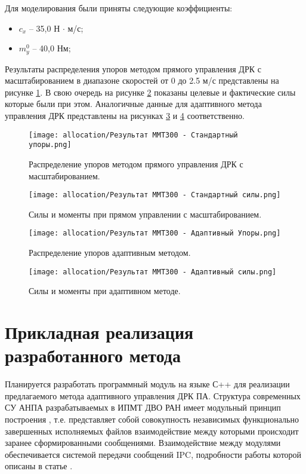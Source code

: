 Для моделирования были приняты следующие коэффициенты:
\begin{itemize}
    \item $c_x$ -- 35,0 Н $\cdot$ м/с;
    \item $m_y^0$ -- 40,0 Нм;
\end{itemize}

Результаты распределения упоров методом прямого управления ДРК с масштабированием в диапазоне скоростей от 0 до 2.5 м/с представлены на рисунке \ref{fig:mmt-300-allocation-fix-thrust}.
В свою очередь на рисунке \ref{fig:mmt-300-allocation-fix-force} показаны целевые и фактические силы которые были при этом.
Аналогичные данные для адаптивного метода управления ДРК представлены на рисунках \ref{fig:mmt-300-allocation-optimal-thrust} и \ref{fig:mmt-300-allocation-optimal-force} соответственно.

\begin{figure}[ht]
    \centering
    \texttt{[image: allocation/Результат ММТ300 - Стандартный упоры.png]}
    \caption{Распределение упоров методом прямого управления ДРК с масштабированием.}
    \label{fig:mmt-300-allocation-fix-thrust}
\end{figure}

\begin{figure}[ht]
    \centering
    \texttt{[image: allocation/Результат ММТ300 - Стандартный силы.png]}
    \caption{Силы и моменты при прямом управлении с масштабированием.}
    \label{fig:mmt-300-allocation-fix-force}
\end{figure}

\begin{figure}[ht]
    \centering
    \texttt{[image: allocation/Результат ММТ300 - Адаптивный Упоры.png]}
    \caption{Распределение упоров адаптивным методом.}
    \label{fig:mmt-300-allocation-optimal-thrust}
\end{figure}

\begin{figure}[ht]
    \centering
    \texttt{[image: allocation/Результат ММТ300 - Адаптивный силы.png]}
    \caption{Силы и моменты при адаптивном методе.}
    \label{fig:mmt-300-allocation-optimal-force}
\end{figure}

\section{Прикладная реализация разработанного метода} \label{sec:Allocation/Software}
Планируется разработать программный модуль на языке С++ для реализации предлагаемого метода адаптивного управления ДРК ПА.
Структура современных СУ АНПА разрабатываемых в ИПМТ ДВО РАН имеет модульный принцип построения \cite{борейко2019система, инзарцев2015реконфигурируемая}, т.е. представляет собой совокупность независимых функционально завершенных исполняемых файлов взаимодействие между которыми происходит заранее сформированными сообщениями.
Взаимодействие между модулями обеспечивается системой передачи сообщений IPC, подробности работы которой описаны в статье \cite{pavin2016reconfigurable}.

